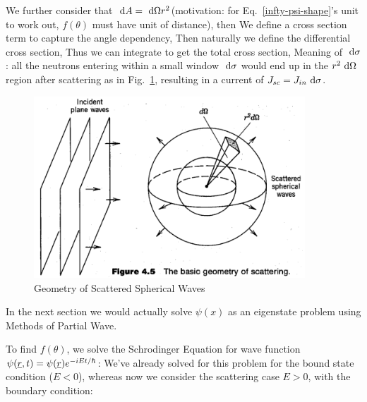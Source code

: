 \documentclass{school-22.101-notes}
\begin{document}
We further consider that $\mbox{ }\mathrm{d} A = \mbox{ }\mathrm{d} \Omega r^2$(motivation: for Eq.~\ref{infty-psi-shape}'s unit to work out, $f(\theta)$ must have unit of distance), then 
We define a cross section term to capture the angle dependency, 
Then naturally we define the differential cross section, 
Thus we can integrate to get the total cross section, 
Meaning of $\mbox{ }\mathrm{d} \sigma$: all the neutrons entering within a small window $\mbox{ }\mathrm{d} \sigma$ would end up in the $r^2 \mbox{ }\mathrm{d} \Omega$ region after scattering as in Fig.~\ref{scattering-geometry}, resulting in a current of $J_{sc} = J_{in} \mbox{ }\mathrm{d} \sigma$. 

\begin{figure}[ht]
\centering
\includegraphics[width=4in]{images/scattering/scattering-geometry.png}
\caption{Geometry of Scattered Spherical Waves} \label{scattering-geometry} 
\end{figure}






In the next section we would actually solve $\psi(x)$ as an eigenstate problem using Methods of Partial Wave. 






 \label{partial-wave}
To find $f(\theta)$, we solve the Schrodinger Equation for wave function $\psi(\underline{r}, t) = \psi(\underline{r}) e^{-iEt/\hbar}$:
We've already solved for this problem for the bound state condition ($E <0$), whereas now we consider the scattering case $E>0$, with the boundary condition:
\end{document}
